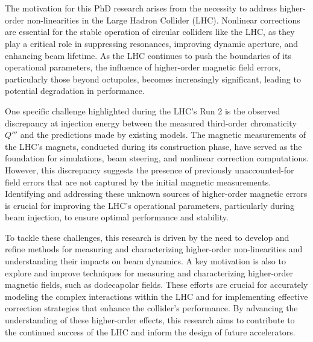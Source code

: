 \section{} 

The motivation for this PhD research arises from the necessity to address higher-order
non-linearities in the Large Hadron Collider (LHC). Nonlinear corrections are essential for the
stable operation of circular colliders like the LHC, as they play a critical role in suppressing
resonances, improving dynamic aperture, and enhancing beam lifetime. As the LHC continues to push
the boundaries of its operational parameters, the influence of higher-order magnetic field errors,
particularly those beyond octupoles, becomes increasingly significant, leading to potential
degradation in performance.

One specific challenge highlighted during the LHC's Run 2 is the observed discrepancy at injection
energy between the measured third-order chromaticity $Q'''$ and the predictions made by existing
models. The magnetic measurements of the LHC's magnets, conducted during its construction phase,
have served as the foundation for simulations, beam steering, and nonlinear correction computations.
However, this discrepancy suggests the presence of previously unaccounted-for field errors that are
not captured by the initial magnetic measurements. Identifying and addressing these unknown sources
of higher-order magnetic errors is crucial for improving the LHC's operational parameters,
particularly during beam injection, to ensure optimal performance and stability.

To tackle these challenges, this research is driven by the need to develop and refine methods for
measuring and characterizing higher-order non-linearities and understanding their impacts on beam
dynamics. A key motivation is also to explore and improve techniques for measuring and
characterizing higher-order magnetic fields, such as dodecapolar fields. These efforts are crucial
for accurately modeling the complex interactions within the LHC and for implementing effective
correction strategies that enhance the collider's performance. By advancing the understanding of
these higher-order effects, this research aims to contribute to the continued success of the LHC and
inform the design of future accelerators.